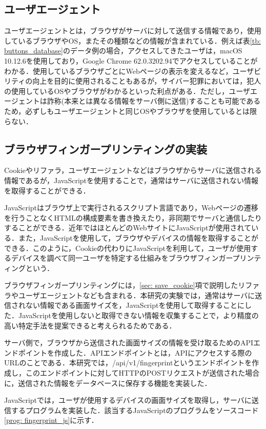 \documentclass[10pt, a4paper]{jreport}
\begin{document}
\subsection*{ユーザエージェント}
ユーザエージェントとは，ブラウザがサーバに対して送信する情報であり，使用しているブラウザやOS，またその種類などの情報が含まれている．例えば表\ref{tb: buttons_database}のデータ例の場合，アクセスしてきたユーザは，macOS 10.12.6を使用しており，Google Chrome 62.0.3202.94でアクセスしていることがわかる．使用しているブラウザごとにWebページの表示を変えるなど，ユーザビリティの向上を目的に使用されることもあるが，サイバー犯罪においては，犯人の使用しているOSやブラウザがわかるといった利点がある．ただし，ユーザエージェントは詐称(本来とは異なる情報をサーバ側に送信)することも可能であるため，必ずしもユーザエージェントと同じOSやブラウザを使用しているとは限らない．

\subsection{ブラウザフィンガープリンティングの実装}
Cookieやリファラ，ユーザエージェントなどはブラウザからサーバに送信される情報であるが，JavaScriptを使用することで，通常はサーバに送信されない情報を取得することができる．

JavaScriptはブラウザ上で実行されるスクリプト言語であり，Webページの遷移を行うことなくHTMLの構成要素を書き換えたり，非同期でサーバと通信したりすることができる．近年ではほとんどのWebサイトにJavaScriptが使用されている．また，JavaScriptを使用して，ブラウザやデバイスの情報を取得することができる．このように，Cookieの代わりにJavaScriptを利用して，ユーザが使用するデバイスを調べて同一ユーザを特定する仕組みをブラウザフィンガープリンティングという．

ブラウザフィンガープリンティングには，\ref{sec: save_cookie}項で説明したリファラやユーザエージェントなども含まれる．本研究の実験では，通常はサーバに送信されない情報である画面サイズを，JavaScriptを使用して取得することにした．JavaScriptを使用しないと取得できない情報を収集することで，より精度の高い特定手法を提案できると考えられるためである．

サーバ側で，ブラウザから送信された画面サイズの情報を受け取るためのAPIエンドポイントを作成した．APIエンドポイントとは，APIにアクセスする際のURLのことである．本研究では，/api/v1/fingerprintというエンドポイントを作成し，このエンドポイントに対してHTTPのPOSTリクエストが送信された場合に，送信された情報をデータベースに保存する機能を実装した．

JavaScriptでは，ユーザが使用するデバイスの画面サイズを取得し，サーバに送信するプログラムを実装した．該当するJavaScriptのプログラムをソースコード\ref{prog: fingerprint_js}に示す．
\end{document}
